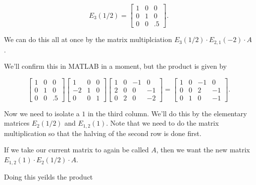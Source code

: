 \documentclass{ximera}
\begin{document}
\begin{exploration}
\begin{example}
$$E_{3}(1/2)=\begin{bmatrix}1 & 0 & 0 \\ 0 & 1 & 0 \\ 0 & 0 & .5\end{bmatrix}.$$

We can do this all at once by the matrix multiplciation $E_{3}(1/2)\cdot E_{2,1}(-2)\cdot A$.

We'll confirm this in MATLAB in a moment, but the product is given by 

\begin{equation*}
 \begin{bmatrix}
    1 & 0 & 0 \\
    0 & 1 & 0 \\
    0 & 0 & .5
  \end{bmatrix} \begin{bmatrix}
    1 & 0 & 0 \\
    -2 & 1 & 0 \\
    0 & 0 & 1
  \end{bmatrix} \begin{bmatrix}
    1 & 0 & -1 & 0 \\
    2 & 0 & 0 & -1 \\
    0 & 2 & 0 & -2
  \end{bmatrix} = \begin{bmatrix}
    1 & 0 & -1 & 0 \\
    0 & 0 & 2 & -1 \\
    0 & 1 & 0 & -1
  \end{bmatrix}.
\end{equation*}

Now we need to isolate a $1$ in the third column. We'll do this by the elementary matrices $E_{2}(1/2)$ and $E_{1,2}(1)$. Note that we need to do the matrix multiplication so that the halving of the second row is done first.

If we take our current matrix to again be called $A$, then we want the new matrix $E_{1,2}(1)\cdot E_{2}(1/2)\cdot A$.

Doing this yeilds the product


\end{example}
\end{exploration}
\end{document}
